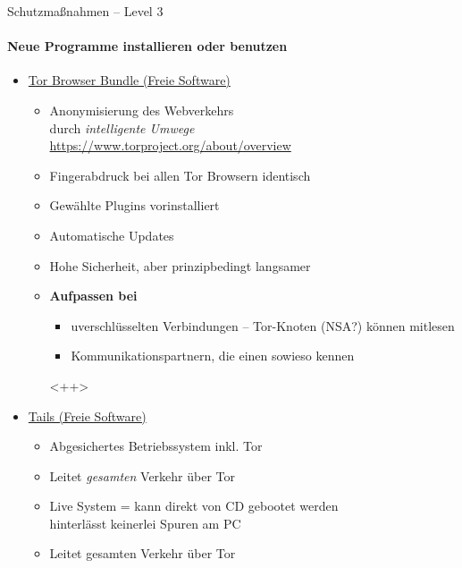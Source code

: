 \begin{frame}{Schutzmaßnahmen -- Level 3}
\framesubtitle{Neue Programme installieren oder benutzen}
  \begin{itemize}
    \item \href{https://www.torproject.org}{Tor Browser Bundle (Freie Software)}
    \begin{itemize}
      \item Anonymisierung des Webverkehrs\\durch \emph{\glqq intelligente Umwege\grqq}\\
        \scriptsize \url{https://www.torproject.org/about/overview} \normalsize
      \item Fingerabdruck bei allen Tor Browsern identisch
      \item Gewählte Plugins vorinstalliert
      \item Automatische Updates
      \item Hohe Sicherheit, aber prinzipbedingt langsamer
      \item \textbf{Aufpassen bei}
        \begin{itemize}
          \item uverschlüsselten Verbindungen -- Tor-Knoten (NSA?) können mitlesen
          \item Kommunikationspartnern, die einen sowieso kennen
        \end{itemize}<++>
    \end{itemize}
    \pause
    \item \href{https://tails.boum.org}{Tails (Freie Software)}
    \begin{itemize}
      \item Abgesichertes Betriebssystem inkl. Tor
      \item Leitet \emph{gesamten} Verkehr über Tor
      \item Live System = kann direkt von CD gebootet werden\\ hinterlässt keinerlei Spuren am PC
      \item Leitet gesamten Verkehr über Tor
    \end{itemize}
  \end{itemize}
\end{frame}

\endinput
